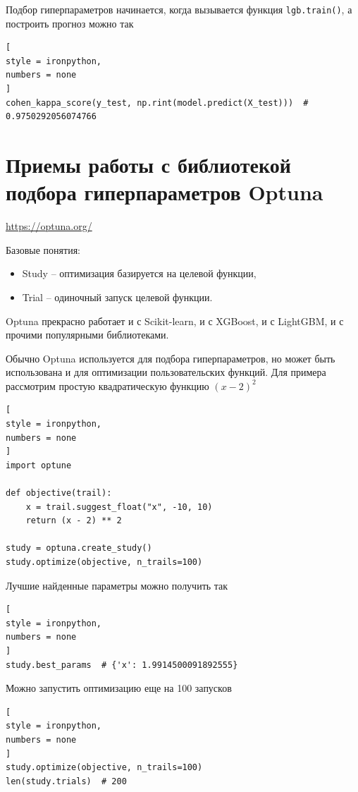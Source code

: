 \documentclass[%
	11pt,
	a4paper,
	utf8,
		]{article}
\begin{document}
Подбор гиперпараметров начинается, когда вызывается функция \verb|lgb.train()|, а построить прогноз можно так
\begin{lstlisting}[
style = ironpython,
numbers = none
]
cohen_kappa_score(y_test, np.rint(model.predict(X_test)))  # 0.9750292056074766
\end{lstlisting}








\section{Приемы работы с библиотекой подбора гиперпараметров Optuna}

\url{https://optuna.org/}

Базовые понятия:
\begin{itemize}
	\item Study -- оптимизация базируется на целевой функции,
	
	\item Trial -- одиночный запуск целевой функции.
\end{itemize}

Optuna прекрасно работает и с Scikit-learn, и с XGBoost, и с LightGBM, и с прочими популярными библиотеками.

Обычно Optuna используется для подбора гиперпараметров, но может быть использована и для оптимизации пользовательских функций. Для примера рассмотрим простую квадратическую функцию $ (x - 2)^2 $
\begin{lstlisting}[
style = ironpython,
numbers = none
]
import optune

def objective(trail):
    x = trail.suggest_float("x", -10, 10)
    return (x - 2) ** 2

study = optuna.create_study()
study.optimize(objective, n_trails=100)
\end{lstlisting}

Лучшие найденные параметры можно получить так
\begin{lstlisting}[
style = ironpython,
numbers = none	
]
study.best_params  # {'x': 1.9914500091892555}
\end{lstlisting}

Можно запустить оптимизацию еще на 100 запусков
\begin{lstlisting}[
style = ironpython,
numbers = none
]
study.optimize(objective, n_trails=100)
len(study.trials)  # 200
\end{lstlisting}
\end{document}
